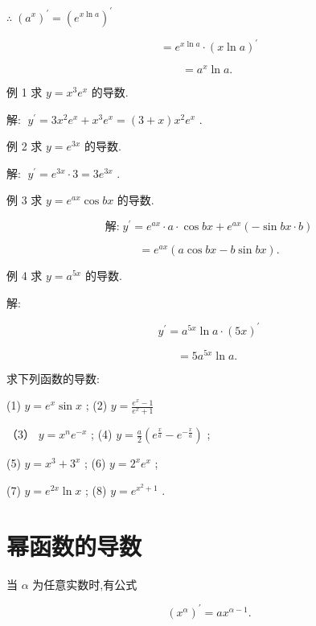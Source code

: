 \documentclass[lang=cn,newtx,12pt,scheme=chinese]{elegantbook}
\begin{document}
\(\therefore \;{\left( {a}^{x}\right) }^{\prime } = {\left( {e}^{x\ln a}\right) }^{\prime }\)

\[
= {e}^{x\ln a} \cdot {\left( x\ln a\right) }^{\prime }
\]

\[
= {a}^{x}\ln a\text{. }
\]

例 1 求 \(y = {x}^{3}{e}^{x}\) 的导数.

解: \(\;{y}^{\prime } = 3{x}^{2}{e}^{x} + {x}^{3}{e}^{x} = \left( {3 + x}\right) {x}^{2}{e}^{x}\) .

例 2 求 \(y = {e}^{3x}\) 的导数.

解: \(\;{y}^{\prime } = {e}^{3x} \cdot 3 = 3{e}^{3x}\) .

例 3 求 \(y = {e}^{ax}\cos {bx}\) 的导数.

\[
\text{解:}\;{y}^{\prime } = {e}^{ax} \cdot a \cdot \cos {bx} + {e}^{ax}\left( {-\sin {bx} \cdot b}\right)
\]

\[
= {e}^{ax}\left( {a\cos {bx} - b\sin {bx}}\right) \text{.}
\]

例 4 求 \(y = {a}^{5x}\) 的导数.

解:

\[
{y}^{\prime } = {a}^{5x}\ln a \cdot {\left( 5x\right) }^{\prime }
\]

\[
= 5{a}^{5x}\ln a\text{. }
\]

\begin{problemset}[练习]

\item 求下列函数的导数:

(1) \(y = {e}^{x}\sin x\) ; (2) \(y = \frac{{e}^{x} - 1}{{e}^{x} + 1}\)

（3） \(y = {x}^{n}{e}^{-x}\) ; (4) \(y = \frac{a}{2}\left( {{e}^{\frac{x}{a}} - {e}^{-\frac{x}{a}}}\right)\) ;

(5) \(y = {x}^{3} + {3}^{x}\) ; (6) \(y = {2}^{x}{e}^{x}\) ;

(7) \(y = {e}^{2x}\ln x\) ; (8) \(y = {e}^{{x}^{2} + 1}\) .

\end{problemset}

\section{幂函数的导数}

\begin{proposition}[幂函数的导数]

当 \(\alpha\) 为任意实数时,有公式

\[
{\left( {x}^{\alpha }\right) }^{\prime } = a{x}^{\alpha - 1}.
\]

\end{proposition}
\end{document}
